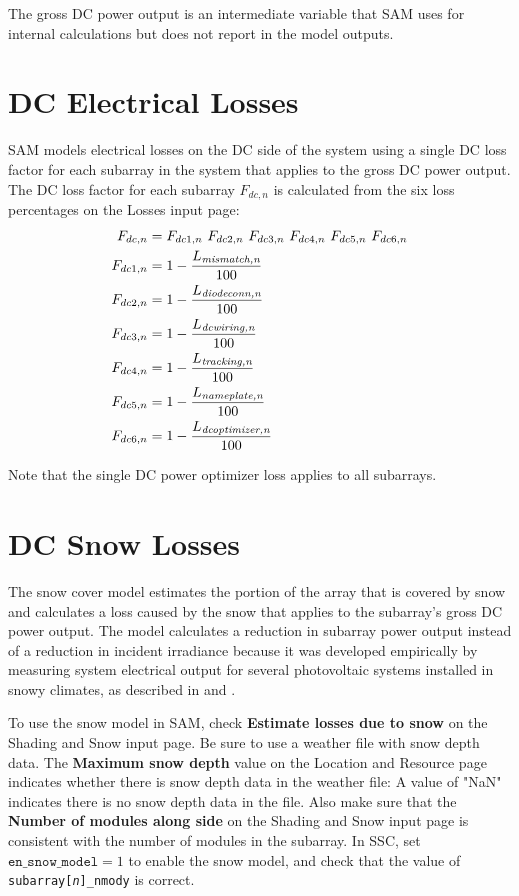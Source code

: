 \documentclass[12pt,letterpaper]{article}
\begin{document}
The gross DC power output is an intermediate variable that SAM uses for internal calculations but does not report in the model outputs.

\section{DC Electrical Losses} \label{sec-dclosses}

SAM models electrical losses on the DC side of the system using a single DC loss factor for each subarray in the system that applies to the gross DC power output. The DC loss factor for each subarray $F_{dc,n}$ is calculated from the six loss percentages on the Losses input page:
\begin{align}\label{eqn-dcderate}
F_{dc,n} &= F_{dc1,n}~F_{dc2,n}~F_{dc3,n}~F_{dc4,n}~F_{dc5,n}~F_{dc6,n} \notag\\
F_{dc1,n} &= 1-\frac{L_{\textit{mismatch,n}}}{100} \notag\\
F_{dc2,n} &= 1-\frac{L_{\textit{diodeconn,n}}}{100} \notag\\
F_{dc3,n} &= 1-\frac{L_{\textit{dcwiring,n}}}{100} \notag\\
F_{dc4,n} &= 1-\frac{L_{\textit{tracking,n}}}{100} \notag\\
F_{dc5,n} &= 1-\frac{L_{\textit{nameplate,n}}}{100} \notag\\
F_{dc6,n} &= 1-\frac{L_{\textit{dcoptimizer,n}}}{100}
\end{align}

Note that the single DC power optimizer loss applies to all subarrays.

\section{DC Snow Losses}\label{sec-snow}

The snow cover model estimates the portion of the array that is covered by snow and calculates a loss caused by the snow that applies to the subarray's gross DC power output. The model calculates a reduction in subarray power output instead of a reduction in incident irradiance because it was developed empirically by measuring system electrical output for several photovoltaic systems installed in snowy climates, as described in \citet{marion-snowmodel} and \citet{ryberg-snowmodel}.

To use the snow model in SAM, check \textbf{Estimate losses due to snow} on the Shading and Snow input page. Be sure to use a weather file with snow depth data. The \textbf{Maximum snow depth} value on the Location and Resource page indicates whether there is snow depth data in the weather file: A value of "NaN" indicates there is no snow depth data in the file. Also make sure that the \textbf{Number of modules along side} on the Shading and Snow input page is consistent with the number of modules in the subarray. In SSC, set $\texttt{en\_snow\_model} = 1$ to enable the snow model, and check that the value of \texttt{subarray[\textit{n}]\_nmody} is correct.
\end{document}
